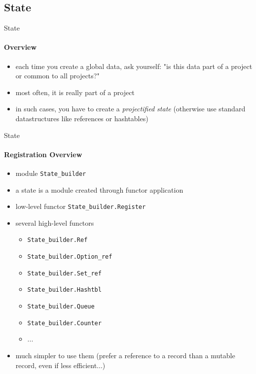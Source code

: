 
\subsection{State}

\begin{frame}{State}
  \framesubtitle{Overview}

\begin{itemize}
\item each time you create a global data, ask yourself: "is this data part of a
  project or common to all projects?"
\item most often, it is really part of a project
\item in such cases, you have to create a \emph{projectified state} (otherwise
  use standard \ocaml datastructures like references or hashtables)
\end{itemize}

\end{frame}


\begin{frame}[fragile]{State}
  \framesubtitle{Registration Overview}

\begin{itemize}
\item module \lstinline+State_builder+
\item a state is a module created through functor application
\item low-level functor \lstinline+State_builder.Register+
\item several high-level functors
  \begin{itemize}
  \item \lstinline+State_builder.Ref+
  \item \lstinline+State_builder.Option_ref+
  \item \lstinline+State_builder.Set_ref+
  \item \lstinline+State_builder.Hashtbl+
  \item \lstinline+State_builder.Queue+
  \item \lstinline+State_builder.Counter+
  \item ...
  \end{itemize}
\item much simpler to use them (prefer a reference to a record than a mutable
  record, even if less efficient...)
\end{itemize}

\end{frame}

